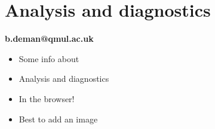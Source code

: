 \vspace{-0.8cm}

{\color{emphasisered} \section{Analysis and diagnostics}}

\vspace{-0.8cm}
\huge
\centering
\textbf{b.deman@qmul.ac.uk}

\normalsize

\begin{itemize}%
	\item Some info about
	\item Analysis and diagnostics
	\item In the browser!
	\item Best to add an image
\end{itemize}
\vspace{-1.6cm}

